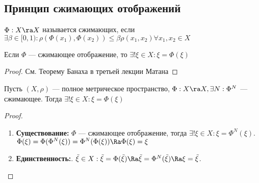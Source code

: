 \subsection{Принцип сжимающих отображений}
\begin{definition}
	\(\Phi: X \ra X\) называется сжимающих, если \(\exists \beta \in [0, 1): \rho(\Phi(x_1), \Phi(x_2)) \le \beta\rho(x_1, x_2) \forall x_1, x_2 \in X\)
\end{definition}

\begin{proposition}
	Если \(\Phi\) --- сжимающее отображение, то \(\exists ! \xi \in X: \xi = \Phi(\xi)\)
\end{proposition}
\begin{proof}
	См. Теорему Банаха в третьей лекции Матана
\end{proof}

\begin{corollary}
	Пусть \((X, \rho)\) --- полное метрическое пространство, \(\Phi: X \ra X, \exists N: \Phi^N\) --- сжимающее. Тогда \(\exists ! \xi \in X: \xi = \Phi(\xi)\)
\end{corollary}
\begin{proof}
	\begin{enumerate}
		\item[] \textbf{Существование:} \(\Phi\) --- сжимающее отображение, тогда \(\exists! \xi \in X: \xi = \Phi^N(\xi)\). \(\Phi(\xi) = \Phi(\Phi^N(\xi)) = \Phi^N(\Phi(\xi)) \Ra \Phi(\xi) = \xi\)
		\item[] \textbf{Единственность:}. \(\tilde{\xi} \in X: \tilde{\xi} = \Phi(\tilde{\xi}) \Ra \tilde{\xi} = \Phi^N(\tilde{\xi}) \Ra \xi = \tilde{\xi}\).
	\end{enumerate}
\end{proof}
